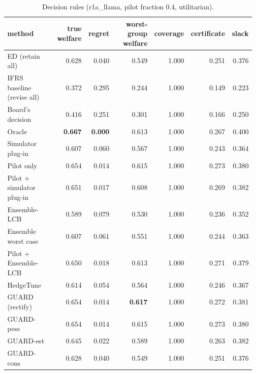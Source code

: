 \begin{table}[t]
\centering
\small
\begin{tabular}{lrrrrrr}
\toprule
method & true welfare & regret & worst-group welfare & coverage & certificate & slack \\
\midrule
ED (retain all) & 0.628 & 0.040 & 0.549 & 1.000 & 0.251 & 0.376 \\
IFRS baseline (revise all) & 0.372 & 0.295 & 0.244 & 1.000 & 0.149 & 0.223 \\
Board's decision & 0.416 & 0.251 & 0.301 & 1.000 & 0.166 & 0.250 \\
Oracle & \textbf{0.667} & \textbf{0.000} & 0.613 & 1.000 & 0.267 & 0.400 \\
Simulator plug-in & 0.607 & 0.060 & 0.567 & 1.000 & 0.243 & 0.364 \\
Pilot only & 0.654 & 0.014 & 0.615 & 1.000 & 0.273 & 0.380 \\
Pilot + simulator plug-in & 0.651 & 0.017 & 0.608 & 1.000 & 0.269 & 0.382 \\
Ensemble-LCB & 0.589 & 0.079 & 0.530 & 1.000 & 0.236 & 0.352 \\
Ensemble worst case & 0.607 & 0.061 & 0.551 & 1.000 & 0.244 & 0.363 \\
Pilot + Ensemble-LCB & 0.650 & 0.018 & 0.613 & 1.000 & 0.271 & 0.379 \\
HedgeTune & 0.614 & 0.054 & 0.564 & 1.000 & 0.246 & 0.367 \\
GUARD (rectify) & 0.654 & 0.014 & \textbf{0.617} & 1.000 & 0.272 & 0.381 \\
GUARD-pess & 0.654 & 0.014 & 0.615 & 1.000 & 0.273 & 0.380 \\
GUARD-est & 0.645 & 0.022 & 0.589 & 1.000 & 0.263 & 0.382 \\
GUARD-cons & 0.628 & 0.040 & 0.549 & 1.000 & 0.251 & 0.376 \\
\bottomrule
\end{tabular}
\caption{Decision rules (r1a\_llama, pilot fraction 0.4, utilitarian).}
\label{tab:methods-utilitarian}
\end{table}
